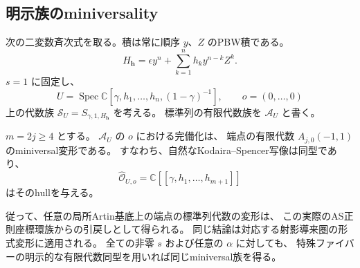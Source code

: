 \subsection{明示族のminiversality}

次の二変数斉次式を取る。積は常に順序 $y$、$Z$ のPBW積である。
\begin{equation}
\label{eq:endpoint-miniversal-H-v37}
 H_{\mathbf h}
 =\epsilon y^n+\sum_{k=1}^{n}h_k y^{n-k}Z^k.
\end{equation}
$s=1$ に固定し、
\[
 U=\operatorname{Spec}\mathbb C[\gamma,h_1,\ldots,h_n,(1-\gamma)^{-1}],
 \qquad o=(0,\ldots,0)
\]
上の代数族
$\mathcal S_U=S_{\gamma,1,H_{\mathbf h}}$ を考える。
標準列の有限代数族を $\mathcal A_U$ と書く。

\begin{theorem}[全端点変形のAS正則実現]
\label{thm:endpoint-miniversal-quantization-v37}
$m=2j\ge4$ とする。
$\mathcal A_U$ の $o$ における完備化は、
端点の有限代数 $A_{j,0}(-1,1)$ のminiversal変形である。
すなわち、自然なKodaira--Spencer写像は同型であり、
\[
 \widehat{\mathcal O}_{U,o}
 =\mathbb C[[\gamma,h_1,\ldots,h_{m+1}]]
\]
はそのhullを与える。

従って、任意の局所Artin基底上の端点の標準列代数の変形は、
この実際のAS正則座標環族からの引戻しとして得られる。
同じ結論は対応する射影導来圏の形式変形に適用される。
全ての非零 $s$ および任意の $\alpha$ に対しても、
特殊ファイバーの明示的な有限代数同型を用いれば同じminiversal族を得る。
\end{theorem}

